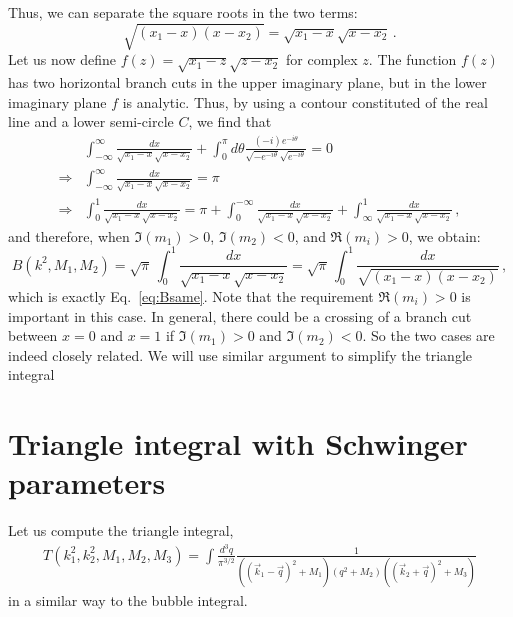 \documentclass[twoside]{article}
\begin{document}
Thus, we can separate the square roots in the two terms:
\begin{equation}
\sqrt{(x_1 - x)(x - x_2)} = \sqrt{x_1 - x}\sqrt{x - x_2}\,.
\end{equation}
Let us now define $f(z) = \sqrt{x_1 - z}\sqrt{z - x_2}$ for complex $z$. The function $f(z)$ has two horizontal branch cuts in the upper imaginary plane, but in the lower imaginary plane $f$ is analytic. Thus, by using a contour constituted of the real line and a lower semi-circle $C$, we find that
\begin{align}
&\int_{-\infty}^{\infty}  \frac{dx}{\sqrt{x_1 - x}\sqrt{x - x_2}} + \int_0^\pi d\theta\frac{(-i) e^{-i \theta }}{\sqrt{-e^{-i \theta }} \sqrt{e^{-i \theta }}} = 0 \\
\Rightarrow & \int_{-\infty}^{\infty}  \frac{dx}{\sqrt{x_1 - x}\sqrt{x - x_2}} = \pi \\
\Rightarrow & \int_{0}^{1}  \frac{dx}{\sqrt{x_1 - x}\sqrt{x - x_2}} = \pi + \int_{0}^{-\infty}  \frac{dx}{\sqrt{x_1 - x}\sqrt{x - x_2}} + \int_{\infty}^{1}  \frac{dx}{\sqrt{x_1 - x}\sqrt{x - x_2}}\,,
\end{align}
and therefore, when $\Im(m_1)>0$, $\Im(m_2)<0$, and $\Re(m_i)>0$, we obtain:
\begin{equation}
B(k^2,M_1,M_2) = \sqrt{\pi} \,\int_0^{1}  \frac{dx}{\sqrt{x_1 - x}\sqrt{x - x_2}} = \sqrt{\pi} \,\int_0^{1}  \frac{dx}{\sqrt{(x_1 - x)(x - x_2)}}\,,
\end{equation}
which is exactly Eq.~\eqref{eq:Bsame}.
Note that the requirement $\Re(m_i) > 0$ is important in this case. In general, there could be a crossing of a branch cut between $x=0$ and $x=1$ if $\Im(m_1)>0$ and $\Im(m_2)<0$. So the two cases are indeed closely related. We will use similar argument to simplify the triangle integral

\section{Triangle integral with Schwinger parameters}
Let us compute the triangle integral,
\begin{align}
  T(k^2_1, k^2_2, M_1, M_2, M_3) = \int \frac{d^3q}{\pi^{3/2}}\frac{1}{((\vec{k}_1 - \vec{q})^2 + M_1) (q^2 + M_2)( (\vec{k}_2 +
\vec{q})^2 + M_3)}
\end{align}
in a similar way to the bubble integral. 
\end{document}
